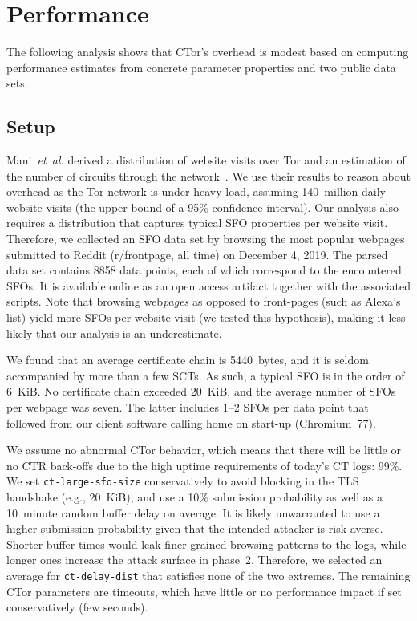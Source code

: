 %
%
\section{Performance} \label{sec:performance}
The following analysis shows that CTor's overhead is modest based on computing
performance estimates from concrete parameter properties and two public data
sets.

\subsection{Setup}
Mani~\emph{et~al.} derived a distribution of website visits over Tor and an
estimation of the number of circuits through the network~\cite{mani}.  We use
their results to reason about overhead as the Tor network is under heavy load,
assuming 140~million daily website visits (the upper bound of a 95\% confidence
interval).  Our analysis also requires a distribution that captures typical SFO
properties per website visit.  Therefore, we collected an SFO data set by
browsing the most popular webpages submitted to Reddit (r/frontpage, all time)
on December 4, 2019.  The parsed data set contains 8858 data points, each of
which correspond to the encountered SFOs.  It is available online as an open
access artifact together with the associated scripts.  Note that browsing
web\emph{pages} as opposed to front-pages (such as Alexa's list) yield more
SFOs per website visit (we tested this hypothesis), making it less likely that
our analysis is an underestimate.

We found that an average certificate chain is 5440~bytes, and it is seldom
accompanied by more than a few SCTs.  As such, a typical SFO is in the order of
6~KiB.  No certificate chain exceeded 20~KiB, and the average number of SFOs per
webpage was seven.  The latter includes 1--2 SFOs per data point that followed
from our client software calling home on start-up (Chromium~77).

We assume no abnormal CTor behavior, which means that there will be little or
no CTR back-offs due to the high uptime requirements of today's CT logs: 99\%.
We set \texttt{ct-large-sfo-size} conservatively to avoid blocking in the TLS
handshake (e.g., 20~KiB), and use a 10\% submission probability as well as a
10~minute random buffer delay on average.  It is likely unwarranted to use a
higher submission probability given that the intended attacker is risk-averse.
Shorter buffer times would leak finer-grained browsing patterns to the logs,
while longer ones increase the attack surface in phase~2.  Therefore, we
selected an average for \texttt{ct-delay-dist} that satisfies none of the two
extremes.  The remaining CTor parameters are timeouts, which have little or no
performance impact if set conservatively (few seconds).


